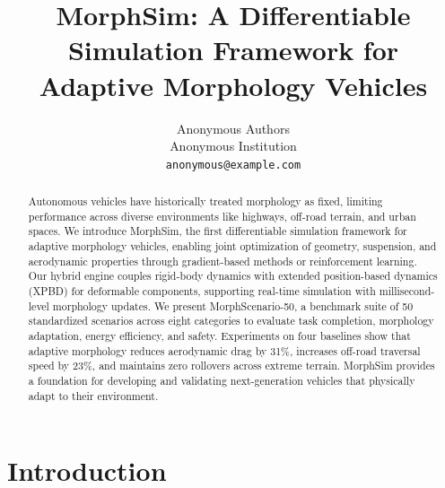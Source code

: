 \documentclass[10pt, review]{article}
\title{MorphSim: A Differentiable Simulation Framework for \\ Adaptive Morphology Vehicles}
\author{
    Anonymous Authors \\
    Anonymous Institution \\
    \texttt{anonymous@example.com}
}
\begin{document}
\maketitle

\begin{abstract}
Autonomous vehicles have historically treated morphology as fixed, limiting performance across diverse environments like highways, off-road terrain, and urban spaces. We introduce MorphSim, the first differentiable simulation framework for adaptive morphology vehicles, enabling joint optimization of geometry, suspension, and aerodynamic properties through gradient-based methods or reinforcement learning. Our hybrid engine couples rigid-body dynamics with extended position-based dynamics (XPBD) for deformable components, supporting real-time simulation with millisecond-level morphology updates. We present MorphScenario-50, a benchmark suite of 50 standardized scenarios across eight categories to evaluate task completion, morphology adaptation, energy efficiency, and safety. Experiments on four baselines show that adaptive morphology reduces aerodynamic drag by 31\%, increases off-road traversal speed by 23\%, and maintains zero rollovers across extreme terrain. MorphSim provides a foundation for developing and validating next-generation vehicles that physically adapt to their environment.
\end{abstract}

\section{Introduction}





% 

% 

% 
% 
\end{document}
